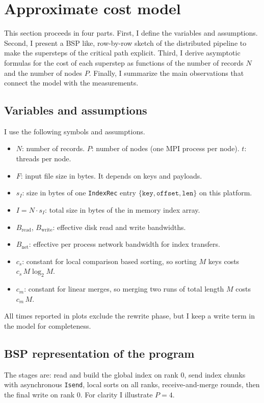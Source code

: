 \documentclass[12pt]{article}
\begin{document}
\section{Approximate cost model}

This section proceeds in four parts. First, I define the variables and assumptions. Second, I present a BSP like, row-by-row sketch of the distributed pipeline to make the supersteps of the critical path explicit. Third, I derive asymptotic formulas for the cost of each superstep as functions of the number of records \(N\) and the number of nodes \(P\). Finally, I summarize the main observations that connect the model with the measurements.

\subsection{Variables and assumptions}
I use the following symbols and assumptions.

\begin{itemize}
  \item \(N\): number of records. \quad \(P\): number of nodes (one MPI process per node). \quad \(t\): threads per node.
  \item \(F\): input file size in bytes. It depends on keys and payloads.
  \item \(s_I\): size in bytes of one \texttt{IndexRec} entry \(\{\texttt{key},\texttt{offset},\texttt{len}\}\) on this platform.
  \item \(I = N \cdot s_I\): total size in bytes of the in memory index array.
  \item \(B_{\text{read}}\), \(B_{\text{write}}\): effective disk read and write bandwidths.
  \item \(B_{\text{net}}\): effective per process network bandwidth for index transfers.
  \item \(c_s\): constant for local comparison based sorting, so sorting \(M\) keys costs \(c_s\,M\log_2 M\).
  \item \(c_m\): constant for linear merges, so merging two runs of total length \(M\) costs \(c_m\,M\).
\end{itemize}

All times reported in plots exclude the rewrite phase, but I keep a write term in the model for completeness.

\subsection{BSP representation of the program}
The stages are: read and build the global index on rank 0, send index chunks with asynchronous \texttt{Isend}, local sorts on all ranks, receive-and-merge rounds, then the final write on rank 0. For clarity I illustrate \(P=4\).
\end{document}
